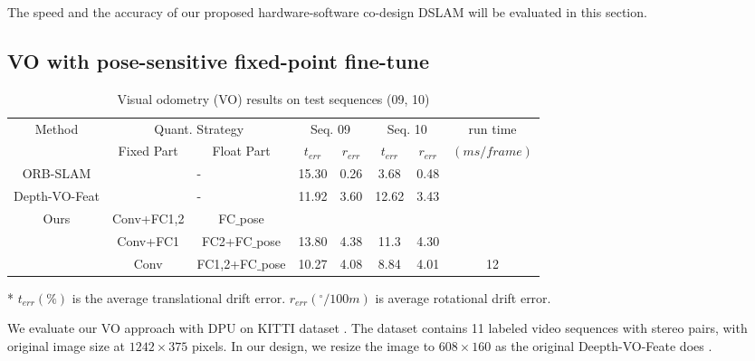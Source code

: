 \label{sec:experiment}
The speed and the accuracy of our proposed hardware-software co-design DSLAM will be evaluated in this section.

\subsection{VO with pose-sensitive fixed-point fine-tune}

\begin{table}[bht]
  \centering
  \caption{Visual odometry (VO) results on test sequences (09, 10)}
  \footnotesize
  \begin{threeparttable}
\begin{tabular}{|c||cc|cc|cc|c|}
\hline
\multirow{2}[2]{*}{Method} & \multicolumn{2}{c|}{Quant. Strategy} & \multicolumn{2}{c|}{Seq. 09} & \multicolumn{2}{c|}{Seq. 10} & run time  \bigstrut[t]\\
                           & Fixed Part             & Float Part  & $t_{err}$        & $r_{err}$ & $t_{err}$        & $r_{err}$ & $(ms/frame)$ \bigstrut[b]\\
\hline
ORB-SLAM  & \multicolumn{2}{c|}{-} &15.30 &0.26 &3.68 &0.48 &  \bigstrut\\
\hline
Depth-VO-Feat\cite{Zhan:2018e92} & \multicolumn{2}{c|}{-} &11.92 &3.60 &12.62 &3.43 &  \bigstrut\\
\hline
\multirow{3}[3]{*}{Ours} & Conv+FC1,2 & FC$\_$pose & & & & & \bigstrut\\
                         & Conv+FC1 & FC2+FC$\_$pose  & 13.80 & 4.38 & 11.3 & 4.30 & \bigstrut\\
                         & Conv & FC1,2+FC$\_$pose &10.27 &4.08 &8.84 &4.01 & 12 \bigstrut\\
\hline
\end{tabular}

\begin{tablenotes}
      \item[*] $t_{err}(\%)$ is the average translational drift error. $r_{err}({}^{\circ}/100m)$ is average rotational drift error.
      \end{tablenotes}
    \end{threeparttable}
  \label{tab:VO}%
\end{table}%


We evaluate our VO approach with DPU on KITTI dataset \cite{geiger2013vision}. The dataset contains 11 labeled video sequences with stereo pairs, with original image size at $1242 \times 375$ pixels. In our design, we resize the image to $608 \times 160$ as the original Deepth-VO-Feate does \cite{Zhan:2018e92}.

